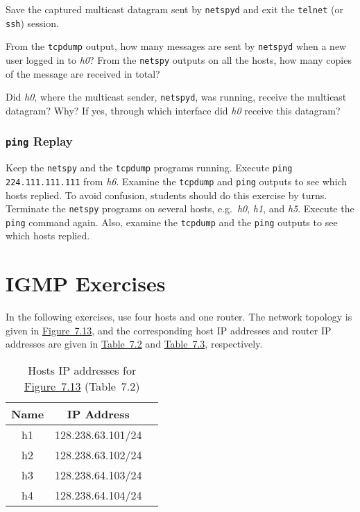 \documentclass{../UTNetLab}
\begin{document}
    Save the captured multicast datagram sent by \lstinline{netspyd} and exit the \lstinline{telnet} (or \lstinline{ssh}) session.

    \begin{report}
    \item From the \lstinline{tcpdump} output, how many messages are sent by \lstinline{netspyd} when a new user logged in to \textit{h0}?
    From the \lstinline{netspy} outputs on all the hosts, how many copies of the message are received in total?

    \item Did \textit{h0}, where the multicast sender, \lstinline{netspyd}, was running, receive the multicast datagram?
    Why?
    If yes, through which interface did \textit{h0} receive this datagram?
    \end{report}

\section{\texttt{ping} Replay}
    Keep the \lstinline{netspy} and the \lstinline{tcpdump} programs running.
    Execute \lstinline{ping 224.111.111.111} from \textit{h6}.
    Examine the \lstinline{tcpdump} and \lstinline{ping} outputs to see which hosts replied.
    To avoid confusion, students should do this exercise by turns.
    Terminate the \lstinline{netspy} programs on several hosts, e.g.\ \textit{h0}, \textit{h1}, and \textit{h5}.
    Execute the \lstinline{ping} command again.
    Also, examine the \lstinline{tcpdump} and the \lstinline{ping} outputs to see which hosts replied.

\part{IGMP Exercises}\label{sec:igmp}
    In the following exercises, use four hosts and one router. The network topology is given in \hyperref[fig:7.13]{Figure~7.13}, and the corresponding host IP addresses and router IP addresses are given in \hyperref[tab:7.2]{Table~7.2} and \hyperref[tab:7.3]{Table~7.3}, respectively.

    \begin{table}[H]
        \caption{Hosts IP addresses for \hyperref[fig:7.13]{Figure~7.13} (Table~7.2)}
        \label{tab:7.2}
        \centering
        \begin{tabular}{ *3c }
            \hline \hline
            Name & IP Address \\
            \hline
                h1 & 128.238.63.101/24 \\
                h2 & 128.238.63.102/24 \\
                h3 & 128.238.64.103/24 \\
                h4 & 128.238.64.104/24 \\
            \hline \hline
            \end{tabular}
    \end{table}
\end{document}

